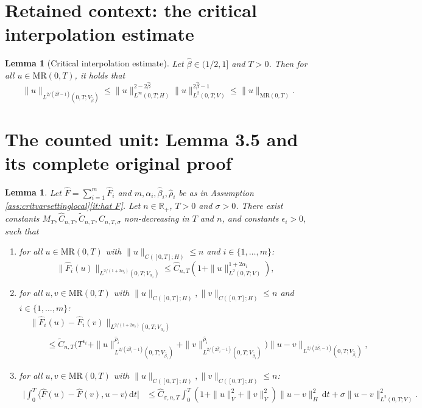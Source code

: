 \documentclass[10pt,a4paper]{amsart}
\newcommand{\dd}{\,\mathrm{d}}
\providecommand{\MR}{}\renewcommand{\MR}{\mathrm{MR}}
\newcommand{\<}{\langle}
\newcommand{\?}{\rangle}
\def\R{{\mathbb R}}
\theoremstyle{plain}
\newtheorem{lemma}[theorem]{Lemma}
\begin{document}
\section*{Retained context: the critical interpolation estimate}

\begin{lemma}[Critical interpolation estimate]\label{lem:crit interpol}
Let  $\hat{\beta}\in (1/2,1]$ and $T>0$.    
Then for all $u\in \MR(0,T)$, it holds that 
\begin{equation*} 
  \|u\|_{L^{{2}/({2\hat{\beta}-1})}(0,T;V_{\hat{\beta}})}\leq   \|u\|_{L^{\infty}(0,T;H)}^{2-2\hat{\beta}}\|u\|_{L^{2}(0,T;V)}^{2\hat{\beta}-1}\leq \|u\|_{\MR(0,T)}.
\end{equation*}
\end{lemma} 


\section{The counted unit: Lemma 3.5 and its complete original proof}

\begin{lemma}\label{lem: 3.8 extra F}
 Let   $\hat{F}=\sum_{i=1}^m \hat{F}_i$ and $m,\alpha_i,\hat{\beta}_i,\hat{\rho}_i$ be as in Assumption \ref{ass:critvarsettinglocal}\ref{it:hat F}.  
  Let $n\in\R_+$, $T>0$ and  $\sigma>0$. 
  There exist  constants $M_T,\hat{C}_{n,T},\tilde{C}_{n,T},C_{n,T,\sigma}$ non-decreasing in $T$ and $n$, and constants $\epsilon_i>0$,  such that
  \begin{enumerate}[label=\emph{(\roman*)},ref=\textup{(\roman*)}]
  \item \label{it:emb4} for all $u\in\MR(0,T)$ with $\|u\|_{C([0,T];H)}\leq n$ and $i\in\{1,\ldots,m\}$:
  \begin{equation*}\label{eq: estimate hat F}
  \|\hat{F}_i(u)\|_{L^{2/(1+2\alpha_i)}(0,T;V_{\alpha_i})}  
   \leq \hat{C}_{n,T}(1+\|u\|_{L^2(0,T;V)}^{1+2\alpha_i}), 
  \end{equation*}
  \item \label{it:emb5} for all $u,v\in\MR(0,T)$ with $\|u\|_{C([0,T];H)},\|v\|_{C([0,T];H)}\leq n$ and $i\in\{1,\ldots,m\}$:
  \begin{align*}\label{eq: estimate hat F difference} 
  &\|\hat{F}_i(u)-\hat{F}_i(v)\|_{L^{2/(1+2\alpha_i)}(0,T;V_{\alpha_i})} \\  
  &\qquad\leq \tilde{C}_{n,T} \Big(T^{\epsilon_i}+\|u\|_{L^{{2}/({2\hat{\beta}_i-1})}(0,T;V_{\hat{\beta}_i})}^{\hat{\rho}_i}+\|v\|_{L^{{2}/({2\hat{\beta}_i-1})}(0,T;V_{\hat{\beta}_i})}^{ \hat{\rho}_i}\Big)\|u-v\|_{L^{{2}/({2\hat{\beta}_i-1})}(0,T;V_{\hat{\beta}_i})}, 
  \end{align*}
  \item \label{it:emb6} for all $u,v\in\MR(0,T)$ with $\|u\|_{C([0,T];H)},\|v\|_{C([0,T];H)}\leq n$:
  \begin{align*} 
  \Big|\int_0^T\<\hat{F}(u)-\hat{F}(v),u-v\?\dd t   \Big|
  &\leq \hat{C}_{\sigma,n,T} \int_0^T  (1+\|u\|_V^2+ \|v\|_V^2)\|u-v\|_H^2\dd t+\sigma\|u-v\|_{L^2(0,T;V)}^2. 
  \end{align*} 
  \end{enumerate}
\end{lemma}
\end{document}
